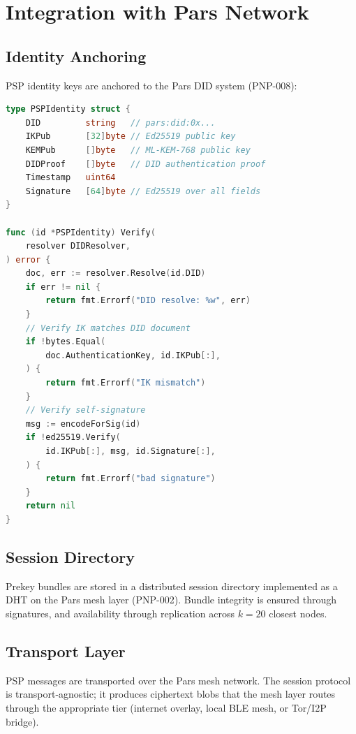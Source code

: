 \documentclass[11pt,a4paper]{article}
\begin{document}
\section{Integration with Pars Network}
\label{sec:integration}

\subsection{Identity Anchoring}

PSP identity keys are anchored to the Pars DID system (PNP-008):

\begin{lstlisting}[language=Go,caption={Identity Anchoring}]
type PSPIdentity struct {
    DID         string   // pars:did:0x...
    IKPub       [32]byte // Ed25519 public key
    KEMPub      []byte   // ML-KEM-768 public key
    DIDProof    []byte   // DID authentication proof
    Timestamp   uint64
    Signature   [64]byte // Ed25519 over all fields
}

func (id *PSPIdentity) Verify(
    resolver DIDResolver,
) error {
    doc, err := resolver.Resolve(id.DID)
    if err != nil {
        return fmt.Errorf("DID resolve: %w", err)
    }
    // Verify IK matches DID document
    if !bytes.Equal(
        doc.AuthenticationKey, id.IKPub[:],
    ) {
        return fmt.Errorf("IK mismatch")
    }
    // Verify self-signature
    msg := encodeForSig(id)
    if !ed25519.Verify(
        id.IKPub[:], msg, id.Signature[:],
    ) {
        return fmt.Errorf("bad signature")
    }
    return nil
}
\end{lstlisting}

\subsection{Session Directory}

Prekey bundles are stored in a distributed session directory implemented
as a DHT on the Pars mesh layer (PNP-002).  Bundle integrity is ensured
through signatures, and availability through replication across $k = 20$
closest nodes.

\subsection{Transport Layer}

PSP messages are transported over the Pars mesh network.  The session
protocol is transport-agnostic; it produces ciphertext blobs that the
mesh layer routes through the appropriate tier (internet overlay, local
BLE mesh, or Tor/I2P bridge).
\end{document}
